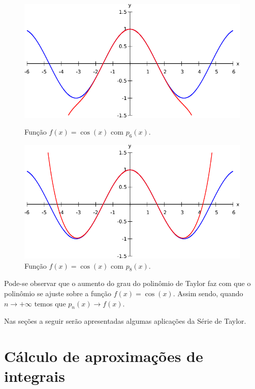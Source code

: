 \documentclass[10pt]{article}
\begin{document}
\begin{figure}[H]
\begin{minipage}[t]{0.45\textwidth}
\centering
\includegraphics[scale=0.68]{fx-px6.pdf}
\caption{Função $f(x)=\cos(x)$ com $p_6(x)$.}
\label{fig4}
\end{minipage}%
\hfill
\begin{minipage}[t]{0.45\textwidth}
\centering
\includegraphics[scale=0.68]{fx-px8.pdf}
\caption{Função $f(x)=\cos(x)$ com $p_8(x)$.}
\label{fig5}
\end{minipage}
\end{figure}
Pode-se observar que o aumento do grau do polinômio de Taylor 
faz com que o polinômio se ajuste sobre a função $f(x)=\cos(x)$. 
Assim sendo, quando $n\rightarrow +\infty$ temos que 
$p_n(x)\rightarrow f(x)$.

Nas seções a seguir serão apresentadas algumas aplicações da Série 
de Taylor.
 
\section{Cálculo de aproximações de integrais}
\end{document}
